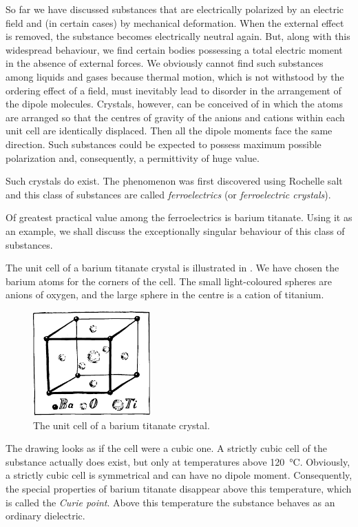 So far we have discussed substances that are electrically polarized by an electric field and (in certain cases) by mechanical deformation. When the external effect is
removed, the substance becomes electrically neutral again. But, along with this widespread behaviour, we find certain bodies possessing a total electric moment in the absence of external forces. We obviously cannot find such substances among liquids and gases because thermal motion, which is not withstood by the ordering effect of a field, must inevitably lead to disorder in the arrangement of the dipole molecules. Crystals, however, can be conceived of in which the atoms are arranged so that the centres of gravity of the anions and cations within each unit cell are identically displaced. Then all the dipole moments face the same direction. Such substances could be expected to possess maximum possible polarization and, consequently, a permittivity of huge value.

Such crystals do exist. The phenomenon was first discovered using Rochelle salt and this class of substances are called \emph{ferroelectrics} (or \emph{ferroelectric crystals}).

Of greatest practical value among the ferroelectrics is barium titanate. Using it as an example, we shall discuss the exceptionally singular behaviour of this class of substances.

The unit cell of a barium titanate crystal is illustrated in . We have chosen the barium atoms for the corners of the cell. The small light-coloured spheres are anions of oxygen, and the large sphere in the centre is a cation of titanium.

\begin{figure}[!ht]
\centering
\includegraphics[width=0.4\textwidth]{figures/fig-02-04.pdf}
\caption{The unit cell of a barium titanate crystal.}
\label{fig-2.4}
\end{figure}

The drawing looks as if the cell were a cubic one. A strictly cubic cell of the substance actually does exist, but only at temperatures above \SI{120}{\celsius}. Obviously, a strictly cubic cell is symmetrical and can have no dipole moment. Consequently, the special properties of barium titanate disappear above this temperature, which is called the \emph{Curie point}. Above this temperature the substance behaves as an ordinary dielectric.

